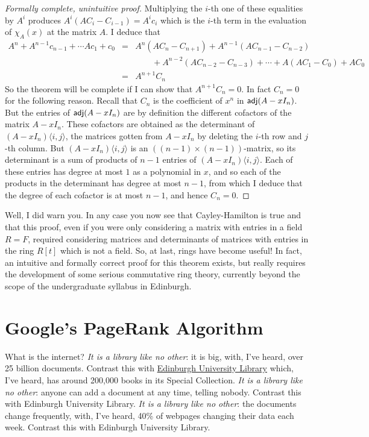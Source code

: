 \documentclass[11pt]{amsbook}
\theoremstyle{definition}
\begin{document}
\begin{proof}[Formally complete, unintuitive proof]
Multiplying the $i$-th one of these equalities by $A^i$ produces $A^i(AC_i - C_{i-1}) = A^i c_i$ which is the $i$-th term in the evaluation of $\chi_A(x)$ at the matrix $A$. I deduce that \begin{eqnarray*}
A^n + A^{n-1} c_{n-1} + \cdots Ac_1 + c_0 & = & A^n(AC_n - C_{n+1}) + A^{n-1}(AC_{n-1} - C_{n-2})  \\ && \qquad + A^{n-2}(AC_{n-2} - C_{n-3}) + \cdots + A(AC_1 - C_0) + AC_0 \\&=& A^{n+1}C_n \end{eqnarray*}
So the theorem will be complete if I can show that $A^{n+1}C_n = 0$. In fact $C_n = 0$ for the following reason. Recall that $C_n$ is the coefficient of $x^n$ in ${\sf adj}(A-xI_n)$. But the entries of ${\sf adj}(A-xI_n)$ are by definition the different cofactors of the matrix $A-xI_n$. These cofactors are obtained as the determinant of $(A-xI_n)\langle i,j\rangle$, the matrices gotten from $A-xI_n$ by deleting the $i$-th row and $j$-th column. But $(A-xI_n)\langle i,j\rangle$ is an $((n-1)\times (n-1))$-matrix, so its determinant is a sum of products of $n-1$ entries of $(A-xI_n)\langle i,j\rangle$. Each of these entries has degree at most $1$ as a polynomial in $x$, and so each of the products in the determinant has degree at most $n-1$, from which I deduce that the degree of each cofactor is at most $n-1$, and hence $C_n = 0$.
 \end{proof}

 Well, I did warn you. In any case you now see that Cayley-Hamilton is true and that this proof, even if you were only considering a matrix with entries in a field $R = F$, required considering matrices and determinants of matrices with entries in the ring $R[t]$ which is not a field. So, at last, rings have become useful! In fact, an intuitive and formally correct proof for this theorem exists, but really requires the development of some serious commutative ring theory, currently beyond the scope of the undergraduate syllabus in Edinburgh.




\section{Google's PageRank Algorithm}

What is the internet? {\it It is a library like no other}: it is big, with, I've heard, over 25 billion documents. Contrast this with \href{http://en.wikipedia.org/wiki/Edinburgh_University_Library}{Edinburgh University Library} which, I've heard, has around 200,000 books in its Special Collection. {\it It is a library like no other}: anyone can add a document at any time, telling nobody. Contrast this with Edinburgh University Library.  {\it It is a library like no other}: the documents change frequently, with, I've heard, 40\% of webpages changing their data each week. Contrast this with Edinburgh University Library.
\end{document}
